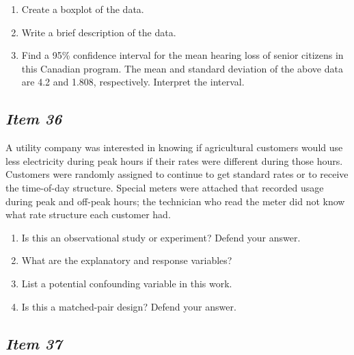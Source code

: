 \begin{enumerate}[leftmargin=1cm, itemsep=.2em]


\item Create a boxplot of the data.


\item Write a brief description of the data.


\item Find a 95\% confidence interval for the mean hearing loss of senior citizens in this Canadian program. The mean and standard deviation of the above data are 4.2 and 1.808, respectively. Interpret the interval.


\end{enumerate}





\subsection{\textbf{\textit{Item 36}}}


A utility company was interested in knowing if agricultural customers would use less electricity during peak hours if their rates were different during those hours. Customers were randomly assigned to continue to get standard rates or to receive the time-of-day structure. Special meters were attached that recorded usage during peak and off-peak hours; the technician who read the meter did not know what rate structure each customer had.


\begin{enumerate}[leftmargin=1cm, itemsep=.2em]


\item Is this an observational study or experiment? Defend your answer.


\item What are the explanatory and response variables?


\item List a potential confounding variable in this work.


\item Is this a matched-pair design? Defend your answer.


\end{enumerate}








\subsection{\textbf{\textit{Item 37}}}



